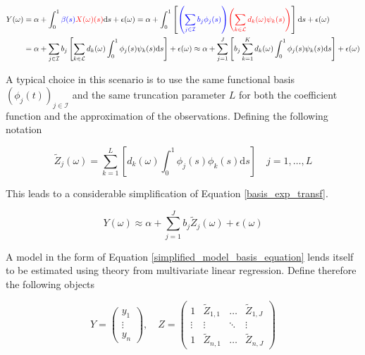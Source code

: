 \documentclass[11pt,twoside,a4paper]{article}
\begin{document}
	\begin{equation}\label{basis_exp_transf}
		\begin{split}
			Y(\omega) & = \alpha + \int_{0}^{1} {\color{blue}\beta(s)} {\color{red}X(\omega)(s)}\mathrm{d}s + \epsilon(\omega)
			 = \alpha + \int_{0}^{1}\left[{\color{blue}\left(\sum_{j \in \mathcal{I}} b_j  \phi_j(s)\right)} {\color{red}\left(\sum_{k \in \mathcal{L}} d_k(\omega)  \psi_k(s)\right)} \right]\mathrm{d}s + \epsilon(\omega) \\
			& = \alpha + \sum_{j \in \mathcal{I}} b_j \left[\sum_{k \in \mathcal{L}} d_k(\omega) \int_{0}^{1} \phi_j(s) \psi_k(s) \mathrm{d}s\right] + \epsilon(\omega) 
			\approx \alpha + \sum_{j = 1}^{J} \left[b_j \sum_{k = 1}^{K}  d_k(\omega) \int_{0}^{1} \phi_j(s) \psi_k(s) \mathrm{d}s\right] + \epsilon(\omega)
		\end{split}
	\end{equation}

	A typical choice in this scenario is to use the same functional basis $\left(\phi_j(t)\right)_{j \in \mathcal{I}}$ and the same truncation parameter $L$ for both the coefficient function and the approximation of the observations. Defining the following notation 

	\begin{equation}
			\tilde{Z}_j(\omega) = \sum_{k = 1}^{L} \left[d_k(\omega) \int_{0}^{1} \phi_j(s) \phi_k(s) \mathrm{d}s \right] \quad j = 1, \dots, L
	\end{equation}

	This leads to a considerable simplification of Equation \ref{basis_exp_transf}.
	
	\begin{equation}\label{simplified_model_basis_equation}
		Y(\omega) \approx \alpha + \sum_{j = 1}^{J} b_j \tilde{Z}_j(\omega) + \epsilon(\omega)
	\end{equation}

		A model in the form of Equation \ref{simplified_model_basis_equation} lends itself to be estimated using theory from multivariate linear regression. Define therefore the following objects
	
	\begin{equation}
		Y = \begin{pmatrix}
			y_1 \\ \vdots \\ y_n
		\end{pmatrix}, \quad
		Z = \begin{pmatrix}
			1 & \tilde{Z}_{1,1} & \dots & \tilde{Z}_{1,J} \\
			\vdots & \vdots & \ddots & \vdots \\
			1 & \tilde{Z}_{n,1} & \dots & \tilde{Z}_{n,J}
		\end{pmatrix}
	\end{equation}
	
\end{document}
